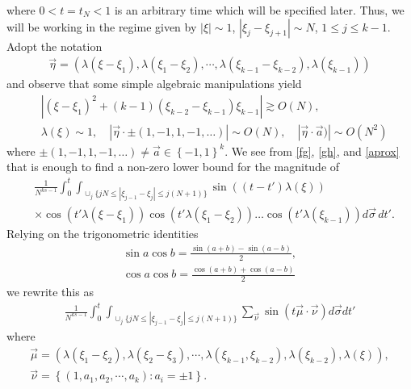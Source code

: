 \documentclass{amsart}
\begin{document}
where $0<t=t_N<1$ is an arbitrary time which will be specified later. 
Thus, we will be working in the regime given by $|\xi| \sim 1$, $|\xi_{j} - \xi_{j+1}|\sim N$, $1 \le j \le k-1$. Adopt the notation
\begin{equation*}
\begin{split}
  \vec{\eta} = \left( \lambda(\xi - \xi_{1}), \lambda(\xi_{1} - \xi_{2}), \cdots, \lambda(\xi_{k-1} - \xi_{k-2}), \lambda(\xi_{k-1}) \right)
\end{split}
\end{equation*}
and observe that some simple algebraic manipulations yield
\begin{equation}
\begin{split}
& |(\xi - \xi_{1})^{2} + (k-1)(\xi_{k-2} - \xi_{k-1})\xi_{k-1}|
\gtrsim O(N),
\\
&
\lambda(\xi) \sim 1,\quad 
|\vec{\eta} \cdot \pm (1, -1, 1, -1, \ldots )| \sim O(N), \quad
|\vec{\eta} \cdot  \vec{a} )| \sim O(N^{2})
\label{aprox}
\end{split}
\end{equation}
where $\pm (1, -1, 1, -1, \ldots ) \neq \vec{a} \in \left\{ -1, 1 \right\}^{k}$.
We see from \eqref{fg}, \eqref{gh}, and \eqref{aprox} that is enough to find a non-zero lower bound for the magnitude of
\begin{equation}
\begin{split}
& \frac{1}{N^{ks-1}}\int_0^t 
\int_{\cup_{j}\{jN \leq |\xi_{j-1}-\xi_{j}|\leq j(N+1)\}}
\sin((t-t') \lambda(\xi))
\\
& \times 
\cos(t' \lambda(\xi- \xi_{1}))
\cos(t' \lambda(\xi_{1}- \xi_{2}))\dots\cos(t'\lambda(\xi_{k-1}))
d \vec{\sigma}\,dt'.
\end{split}
\end{equation}
Relying on the trigonometric identities
\begin{gather*}
\sin a\cos b= \frac{\sin(a + b) - \sin(a-b)}{2},
\\
\cos a \cos b = \frac{\cos(a + b) + \cos(a-b)}{2}
\end{gather*}
we rewrite this as
\begin{gather*}
  \frac{1}{N^{ks-1}} \int_{0}^{t}
\int_{\cup_{j}\{jN \leq |\xi_{j-1}-\xi_{j}|\leq j(N+1)\}}
\sum_{\vec{\nu}}  \sin(t \vec{\mu} \cdot \vec{\nu}) d \vec{\sigma} dt'
\end{gather*}
where
\begin{gather*}
  \vec{\mu} = \left ( \lambda(\xi_{1} - \xi_{2}), \lambda(\xi_{2} - \xi_{3}), \cdots, \lambda(\xi_{k-1}, \xi_{k-2}), \lambda(\xi_{k-2}), \lambda(\xi) \right ),
  \\
  \vec{\nu} = \left \{ (1, a_{1}, a_{2}, \cdots, a_{k}): a_{i} = \pm 1 \right \}.
\end{gather*}
\end{document}
